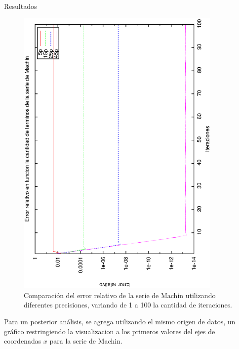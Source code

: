 \begin{section}{Resultados}
	\begin{figure}[H]
	  \centering
		\includegraphics[width=10cm,angle=-90]{graficos/machin_1a100it.eps}
	  \caption{Comparación del error relativo de la serie de Machin utilizando diferentes precisiones, variando de 1 a 100 la cantidad de iteraciones.}
	  \label{fig:machin_100it}
	\end{figure}
	
	Para un posterior análisis, se agrega utilizando el mismo origen de datos, un gráfico restringiendo la visualizacion a los primeros valores del ejes de coordenadas $x$ para la serie de Machin.
	

\end{section}
